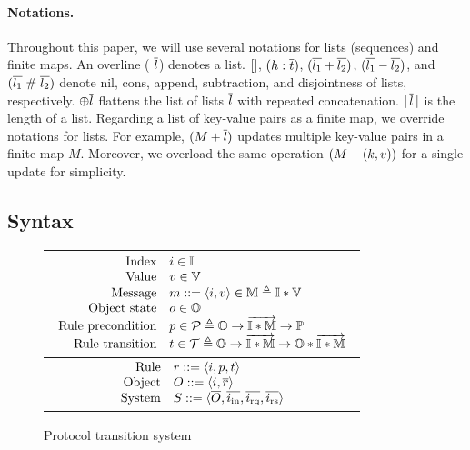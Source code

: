 \documentclass[sigplan,10pt,review,anonymous,screen]{acmart}\settopmatter{printfolios=true,printccs=false,printacmref=false}
\begin{document}
\paragraph{Notations.}
Throughout this paper, we will use several notations for lists (sequences) and finite maps.
An overline (\eg{} $\overline{l}$) denotes a list.
$\lbrack\rbrack{}$, $(h : \overline{t})$, $(\overline{l_1} + \overline{l_2})$, $(\overline{l_1} - \overline{l_2})$, and
$(\overline{l_1} \; \# \; \overline{l_2})$ denote nil, cons, append, subtraction, and disjointness of lists, respectively.
$\oplus \overline{l}$ flattens the list of lists $\overline{l}$ with repeated concatenation.
$|\, \overline{l}\, |$ is the length of a list.
Regarding a list of key-value pairs as a finite map, we override notations for lists.
For example, $(M + \overline{l})$ updates multiple key-value pairs in a finite map $M$.
Moreover, we overload the same operation $(M + (k, v))$ for a single update for simplicity.

\subsection{Syntax}
\label{sec-syntax}

\begin{figure}[t]
  \centering\small
  \begin{tabular}{|c|}
    \hline
    \begin{math}
      \begin{array}{rl}
        \textrm{Index} & i \in \mathbb{I}{} \\
        \textrm{Value} & v \in \mathbb{V}{} \\
        \textrm{Message} & m ::= \langle i, v \rangle \in \mathbb{M}{} \triangleq \mathbb{I} \ast \mathbb{V} \\
        \textrm{Object state} & o \in \mathbb{O}{} \\
        \textrm{Rule precondition} & p \in
        \mathcal{P} \triangleq \mathbb{O} \to \overrightarrow{\mathbb{I} \ast \mathbb{M}} \to \mathbb{P} \\
        \textrm{Rule transition} & t \in
        \mathcal{T} \triangleq \mathbb{O} \to \overrightarrow{\mathbb{I} \ast \mathbb{M}} \to \mathbb{O} \ast \overrightarrow{\mathbb{I} \ast \mathbb{M}} \\
      \end{array}
    \end{math}\\
    \hline
    \begin{math}
      \begin{array}{rl}
        \textrm{Rule} & r ::= \langle i, p, t \rangle \\
        \textrm{Object} & O ::= \langle i, \overline{r} \rangle \\
        \textrm{System} & S ::= \langle \overline{O}, \overline{i_{\textrm{in}}}, \overline{i_{\textrm{rq}}}, \overline{i_{\textrm{rs}}} \rangle \\
      \end{array}
    \end{math}\\
    \hline
  \end{tabular}
  \caption{Protocol transition system}
  \label{fig-trs-system}
\end{figure}
\end{document}
